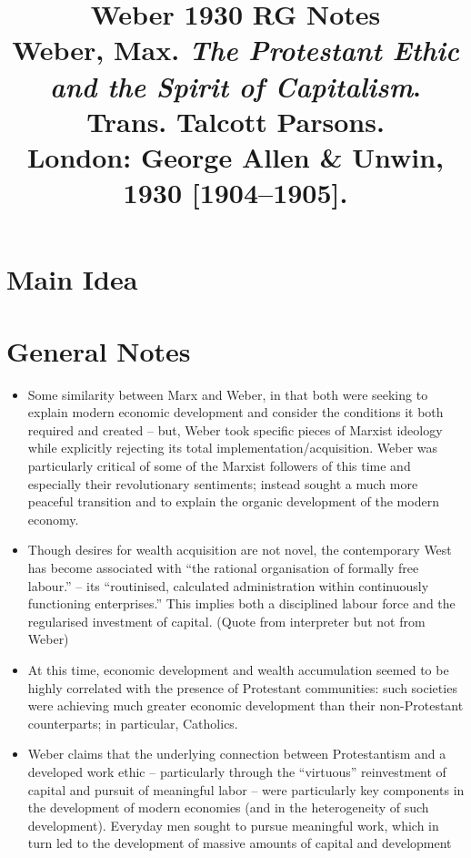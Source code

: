 \documentclass[12pt]{article}
\title{\textbf{Weber 1930 RG Notes}\\
\large Weber, Max. \textit{The Protestant Ethic and the Spirit of Capitalism}. Trans. Talcott Parsons.\\
London: George Allen \& Unwin, 1930 [1904--1905].}
\author{}
\date{}
\begin{document}
\maketitle

\section{Main Idea}



\section{General Notes}

\begin{itemize}[leftmargin=*, itemsep=4pt]
    \item Some similarity between Marx and Weber, in that both were seeking to explain modern economic development and consider the conditions it both required and created -- but, Weber took specific pieces of Marxist ideology while explicitly rejecting its total implementation/acquisition. Weber was particularly critical of some of the Marxist followers of this time and especially their revolutionary sentiments; instead sought a much more peaceful transition and to explain the organic development of the modern economy.
    \item Though desires for wealth acquisition are not novel, the contemporary West has become associated with ``the rational organisation of formally free labour.'' -- its ``routinised, calculated administration within continuously functioning enterprises.'' This implies both a disciplined labour force and the regularised investment of capital. (Quote from interpreter but not from Weber)
    \item At this time, economic development and wealth accumulation seemed to be highly correlated with the presence of Protestant communities: such societies were achieving much greater economic development than their non-Protestant counterparts; in particular, Catholics.
    \item Weber claims that the underlying connection between Protestantism and a developed work ethic -- particularly through the ``virtuous'' reinvestment of capital and pursuit of meaningful labor -- were particularly key components in the development of modern economies (and in the heterogeneity of such development). Everyday men sought to pursue meaningful work, which in turn led to the development of massive amounts of capital and development
\end{itemize}
\end{document}
